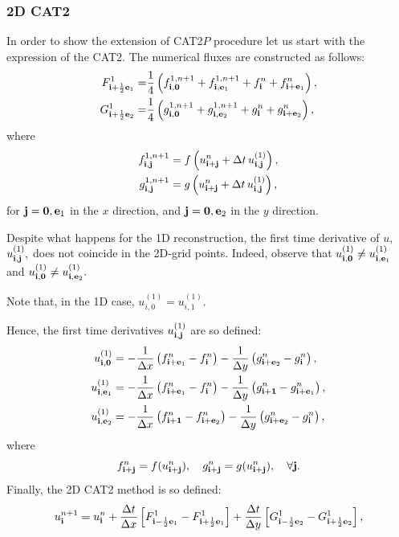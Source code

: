 \subsubsection{2D CAT2}
In order to show the extension of CAT2$P$ procedure let us start with the expression of the CAT2. The numerical fluxes are constructed as follows:
\begin{align}
\label{2Dfluxes}
F_{\mathbf{i} +  \frac{1}{2}\mathbf{e}_1}^1 = & \frac{1}{4}\left( {f}^{1,n+1}_{\mathbf{i},\mathbf{0}} + {f}^{1,n+1}_{\mathbf{i}, \mathbf{e}_1} + f^{n}_{\mathbf{i}} +f^{n}_{\mathbf{i} + \mathbf{e}_1}\right), \\
G_{\mathbf{i} +  \frac{1}{2}\mathbf{e}_2}^1 = & \frac{1}{4}\left( {g}^{1,n+1}_{\mathbf{i},\mathbf{0}} + {g}^{1,n+1}_{\mathbf{i}, \mathbf{e}_2} + g^{n}_{\mathbf{i}} +g^{n}_{\mathbf{i} + \mathbf{e}_2}\right), 
\end{align}
where 
\begin{align*}
f^{1,n+1}_{\mathbf{i}, \mathbf{j}} &= f\left(u_{\mathbf{i} + \mathbf{j}}^n +\Delta t \, u^{(1)}_{\mathbf{i}, \mathbf{j}}\right), \\
g^{1,n+1}_{\mathbf{i}, \mathbf{j}} &= g\left(u_{\mathbf{i} + \mathbf{j}}^n +\Delta t \,  u^{(1)}_{\mathbf{i}, \mathbf{j}}\right),
\end{align*}
for $\mathbf{j}= \mathbf{0}, \mathbf{e}_1$ in the $x$ direction, and $\mathbf{j} = \mathbf{0}, \mathbf{e}_2$ in the $y$ direction.
\begin{rem}
Despite what happens for the 1D reconstruction, the first time derivative of $u,$ $u^{(1)}_{\mathbf{i}, \mathbf{j}},$ does not coincide in the 2D-grid points. Indeed, observe  that $u^{(1)}_{\mathbf{i}, \mathbf{0}} \neq u^{(1)}_{\mathbf{i}, \mathbf{e}_1}$ and $u^{(1)}_{\mathbf{i}, \mathbf{0}} \neq u^{(1)}_{\mathbf{i}, \mathbf{e}_2}.$ 

Note that, in the 1D case, $u^{(1)}_{i,0 }= u^{(1)}_{i, 1} $.
\end{rem}
Hence, the first time derivatives $u^{(1)}_{\mathbf{i},\mathbf{j}}$ are so defined: 
\begin{align*}
u^{(1)}_{\mathbf{i}, \mathbf{0}} &= -\frac{1}{\Delta x}\left( f_{\mathbf{i} + \mathbf{e}_1}^n - f_{\mathbf{i}}^n\right) 
-\frac{1}{\Delta y}\left( g_{\mathbf{i} + \mathbf{e}_2}^n - g_{\mathbf{i}}^n\right),  \\
u^{(1)}_{\mathbf{i}, \mathbf{e}_1} &= -\frac{1}{\Delta x}\left( f_{\mathbf{i} + \mathbf{e}_1}^n - f_{\mathbf{i}}^n\right)
-\frac{1}{\Delta y}\left( g_{\mathbf{i} + \mathbf{1}}^n - g_{\mathbf{i} + \mathbf{e}_1}^n\right), \\ 
u^{(1)}_{\mathbf{i}, \mathbf{e}_2} &= -\frac{1}{\Delta x}\left( f_{\mathbf{i} + \mathbf{1}}^n - f_{\mathbf{i} + \mathbf{e}_2}^n\right) 
-\frac{1}{\Delta y}\left( g_{\mathbf{i} + \mathbf{e}_2}^n - g_{\mathbf{i}}^n\right), 
\end{align*} 
where 
$$ f_{\mathbf{i}+\mathbf{j}}^n = f(u_{\mathbf{i}+\mathbf{j}}^n), \quad g_{\mathbf{i}+\mathbf{j}}^n =g(u_{\mathbf{i}+\mathbf{j}}^n), \quad \forall \mathbf{j}.$$
Finally, the 2D CAT2 method is so defined:
\begin{equation}
\label{2D_CAT2_cons}
u_{\mathbf{i}}^{n+1}=u_{\mathbf{i}}^n + \frac{\Delta t}{\Delta x}\left[ {F}_{\mathbf{i} -  \frac{1}{2}\mathbf{e}_1}^1-{F}_{\mathbf{i} +  \frac{1}{2}\mathbf{e}_1}^1\right] +
\frac{\Delta t}{\Delta y}\left[ {G}_{\mathbf{i} -  \frac{1}{2}\mathbf{e}_2}^1-{G}_{\mathbf{i} +  \frac{1}{2}\mathbf{e}_2}^1\right],  
\end{equation}

